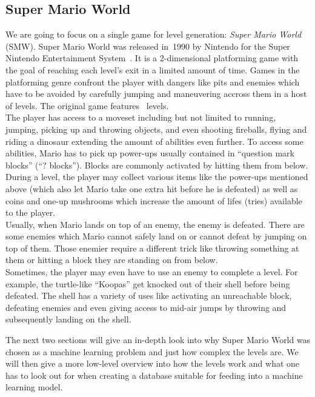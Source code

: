 \subsection{Super Mario World}

We are going to focus on a single game for level generation:
\emph{Super Mario World} (SMW). Super Mario World was released in~1990
by Nintendo for the Super Nintendo Entertainment
System~\cite{SuperMarioWorld2019}. It is a 2-dimensional platforming
game with the goal of reaching each level's exit in a limited amount
of time. Games in the platforming genre confront the player with
dangers like pits and enemies which have to be avoided by carefully
jumping and maneuvering accross them in a host of levels. The original
game features %
~levels. \\
The player has access to a moveset including but not limited to
running, jumping, picking up and throwing objects, and even shooting
fireballs, flying and riding a dinosaur extending the amount of
abilities even further. To access some abilities, Mario has to pick up
power-ups usually contained in ``question mark blocks'' (``? blocks'').
Blocks are commonly activated by hitting them from below. During a
level, the player may collect various items like the power-ups
mentioned above (which also let Mario take one extra hit before he is
defeated) as well as coins and one-up mushrooms which increase the
amount of lifes (tries) available to the player. \\
Usually, when Mario lands on top of an enemy, the enemy is defeated.
There are some enemies which Mario cannot safely land on or cannot
defeat by jumping on top of them. Those enemier require a different
trick like throwing something at them or hitting a block they are
standing on from below. \\
Sometimes, the player may even have to use an enemy to complete a
level. For example, the turtle-like ``Koopas'' get knocked out of
their shell before being defeated. The shell has a variety of uses
like activating an unreachable block, defeating enemies and even
giving access to mid-air jumps by throwing and subsequently landing on
the shell.

The next two sections will give an in-depth look into why Super Mario
World was chosen as a machine learning problem and just how complex
the levels are. We will then give a more low-level overview into how
the levels work and what one has to look out for when creating a
database suitable for feeding into a machine learning model.

